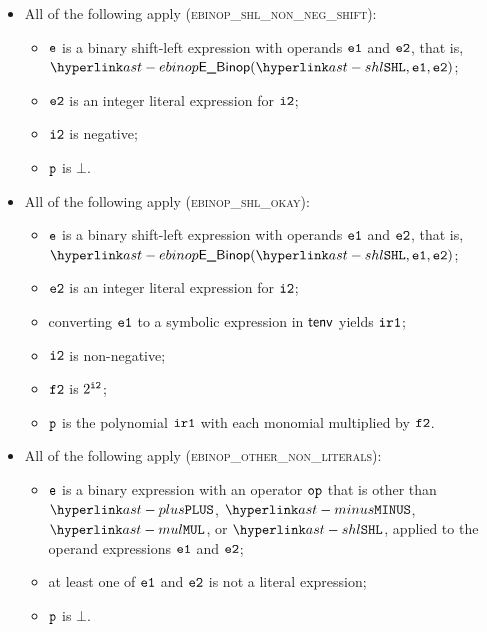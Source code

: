\begin{itemize}
  \item All of the following apply (\textsc{ebinop\_shl\_non\_neg\_shift}):
  \begin{itemize}
    \item $\texttt{e}$ is a binary shift-left expression with operands $\texttt{e1}$ and $\texttt{e2}$, that is, \\ $\EBinop(\SHL, \veone, \vetwo)$;
    \item $\texttt{e2}$ is an integer literal expression for $\texttt{i2}$;
    \item $\texttt{i2}$ is negative;
    \item $\texttt{p}$ is $\bot$.
  \end{itemize}

  \item All of the following apply (\textsc{ebinop\_shl\_okay}):
  \begin{itemize}
    \item $\texttt{e}$ is a binary shift-left expression with operands $\texttt{e1}$ and $\texttt{e2}$, that is, \\ $\EBinop(\SHL, \veone, \vetwo)$;
    \item $\texttt{e2}$ is an integer literal expression for $\texttt{i2}$;
    \item converting $\texttt{e1}$ to a symbolic expression in $\textsf{tenv}$ yields $\texttt{ir1}$\ProseOrTypeErrorOrBot;
    \item $\texttt{i2}$ is non-negative;
    \item $\texttt{f2}$ is $2^{\texttt{i2}}$;
    \item $\texttt{p}$ is the polynomial $\texttt{ir1}$ with each monomial multiplied by $\texttt{f2}$.
  \end{itemize}

  \item All of the following apply (\textsc{ebinop\_other\_non\_literals}):
  \begin{itemize}
    \item $\texttt{e}$ is a binary expression with an operator $\texttt{op}$ that is other than $\PLUS$, $\MINUS$, $\MUL$, or $\SHL$,
          applied to the operand expressions $\texttt{e1}$ and $\texttt{e2}$;
    \item at least one of $\texttt{e1}$ and $\texttt{e2}$ is not a literal expression;
    \item $\texttt{p}$ is $\bot$.
  \end{itemize}


\end{itemize}
